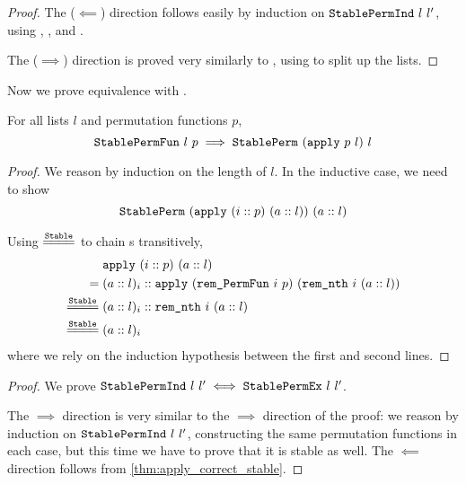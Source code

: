 \documentclass[sigplan,10pt,anonymous,review]{thesis}
\begin{document}
\stablepermindiff*
\begin{proof}
  The ($\impliedby$) direction follows easily by induction on
  $\texttt{\textup{StablePermInd}}~l~l'$, using ,
  , and .

  The ($\implies$) direction is proved very similarly to
  , using  to split up
  the lists.
\end{proof}

Now we prove equivalence with .

\begin{theorem}
  \label{thm:apply_correct_stable}
  For all lists $l$ and permutation functions $p$,
  \begin{equation*}
    \texttt{\textup{StablePermFun}}~l~p \implies \texttt{\textup{StablePerm}}~(\texttt{\textup{apply}}~p~l)~l
  \end{equation*}
\end{theorem}
\begin{proof}
  We reason by induction on the length of $l$. In the inductive case,
  we need to show
  \begin{equation*}
    \texttt{\textup{StablePerm}}~(\texttt{\textup{apply}}~(i :: p)~(a :: l))~(a :: l)
  \end{equation*}

  Using $\eqstable$ to chain s transitively,
  \begin{align*}
    {}& \var{apply}~(i :: p)~(a :: l) \\
    ={}& (a :: l)_i  ::
    \var{apply}~(\var{rem\_PermFun}~i~p)~(\var{rem\_nth}~i~(a :: l)) \\
    \eqstable{}& (a :: l)_i :: \var{rem\_nth}~i~(a :: l) \\
    \eqstable{}& (a :: l)_i
  \end{align*}
  where we rely on the induction hypothesis between the first and
  second lines.
\end{proof}

\stablepermexiff*
\begin{proof}
  We prove $\texttt{\textup{StablePermInd}}~l~l' \iff \texttt{\textup{StablePermEx}}~l~l'$.

  The $\implies$ direction is very similar to the $\implies$ direction
  of the  proof: we reason by induction on
  $\texttt{\textup{StablePermInd}}~l~l'$, constructing the same permutation
  functions in each case, but this time we have to prove that it is
  stable as well. The $\impliedby$ direction follows from
  \cref{thm:apply_correct_stable}.
\end{proof}
\end{document}
